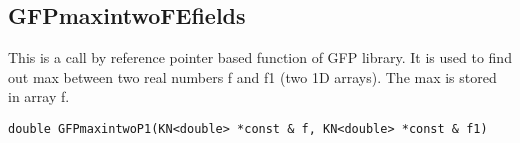 \subsection{GFPmaxintwoFEfields}
This is a call by reference pointer based function of GFP library. It is used to find out max between two real numbers {\ttfamily f} and {\ttfamily f1} (two 1D arrays). The max is stored in array {\ttfamily f}.
\begin{lstlisting}[language=PSD]
double GFPmaxintwoP1(KN<double> *const & f, KN<double> *const & f1)
\end{lstlisting}
